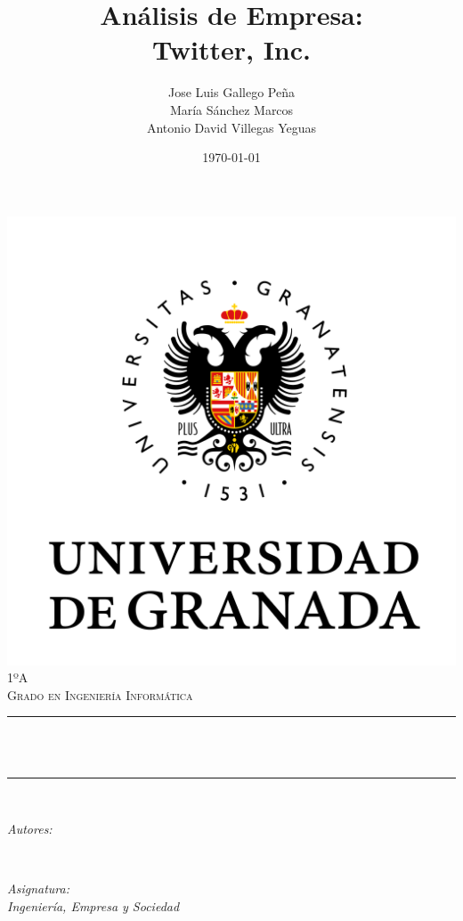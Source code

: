 \documentclass[12pt, spanish]{article}
\title{Análisis de Empresa: \\
Twitter, Inc.}
\author{Jose Luis Gallego Peña \\
María Sánchez Marcos \\
Antonio David Villegas Yeguas}
\date{\today}
\makeatletter
\let\thetitle\@title
\let\theauthor\@author
\let\thedate\@date
\makeatother
\begin{document}

\begin{titlepage}
    \centering
    \vspace*{0.5 cm}
    \includegraphics[scale = 0.50]{ugr.png}\\[1.0 cm]
    \textsc{\large 1ºA}\\[0.5 cm]            
    \textsc{\large Grado en Ingeniería Informática}\\[0.5 cm]              
    \rule{\linewidth}{0.2 mm} \\[0.4 cm]
    { \huge \bfseries \thetitle}\\
    \rule{\linewidth}{0.2 mm} \\[1.5 cm]
    
    \begin{minipage}{0.4\textwidth}
        \begin{flushleft} \large
            \emph{Autores:}\\
            \theauthor
            \end{flushleft}
            \end{minipage}~
            \begin{minipage}{0.4\textwidth}
            \begin{flushright} \large
            \emph{Asignatura: \\
            Ingeniería, Empresa y Sociedad}                   
        \end{flushright}
    \end{minipage}\\[1 cm]
  	
    {\large \thedate}\\[1 cm]
 	
    \vfill
    
\end{titlepage}
\end{document}
